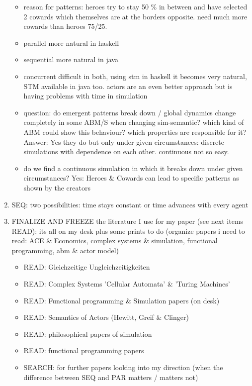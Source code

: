\begin{enumerate}
\begin{itemize}
		\item reason for patterns: heroes try to stay 50 \% in between and have selected 2 cowards which themselves are at the borders opposite. need much more cowards than heroes 75/25.
		
		\item parallel more natural in haskell
		\item sequential more natural in java
		\item concurrent difficult in both, using stm in haskell it becomes very natural, STM available in java too. actors are an even better approach but is having problems with time in simulation
		
		\item question: do emergent patterns break down / global dynamics change completely in some ABM/S when changing sim-semantic? which kind of ABM could show this behaviour? which properties are responsible for it? Answer: Yes they do but only under given circumstances: discrete simulations with dependence on each other. continuous not so easy. 
		
		\item do we find a continuous simulation in which it breaks down under given circumstances? Yes: Heroes \& Cowards can lead to specific patterns as shown by the creators
	\end{itemize}
	
\item SEQ: two possibilities: time stays constant or time advances with every agent

\item FINALIZE AND FREEZE the literature I use for my paper (see next items READ): its all on my desk plus some prints to do (organize papers i need to read: ACE \& Economics, complex systems \& simulation, functional programming, abm \& actor model)
	\begin{itemize}
		\item READ: Gleichzeitige Ungleichzeitigkeiten
		\item READ: Complex Systems 'Cellular Automata' \& 'Turing Machines'
		\item READ: Functional programming \& Simulation papers (on desk)
		\item READ: Semantics of Actors (Hewitt, Greif \& Clinger)
		\item READ: philosophical papers of simulation
		\item READ: functional programming papers
		\item SEARCH: for further papers looking into my direction (when the difference between SEQ and PAR matters / matters not)
	\end{itemize}


\end{enumerate}
